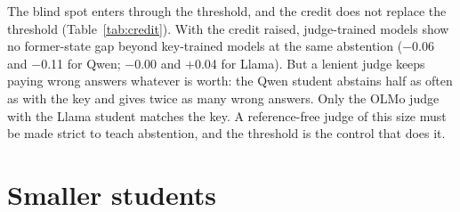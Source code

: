 \begin{table}[H]
\small
\centering
\setlength{\tabcolsep}{3.5pt}
\caption{Abstention taught by a higher credit with judges at their default threshold, against the strict cut. Shares of PopQA held-out questions that are refused, answered wrongly and answered rightly, and the share of known former-state capitals refused. One or two runs per credit row. Right and wrong are by the answer key alone.}
\label{tab:credit}
\end{table}

The blind spot enters through the threshold, and the credit does not replace the threshold (Table~\ref{tab:credit}). With the credit raised, judge-trained models show no former-state gap beyond key-trained models at the same abstention ($-$0.06 and $-$0.11 for Qwen; $-$0.00 and $+$0.04 for Llama). But a lenient judge keeps paying wrong answers whatever \idk{} is worth: the Qwen student abstains half as often as with the key and gives twice as many wrong answers. Only the OLMo judge with the Llama student matches the key. A reference-free judge of this size must be made strict to teach abstention, and the threshold is the control that does it.

\section{Smaller students}
\label{app:small}

